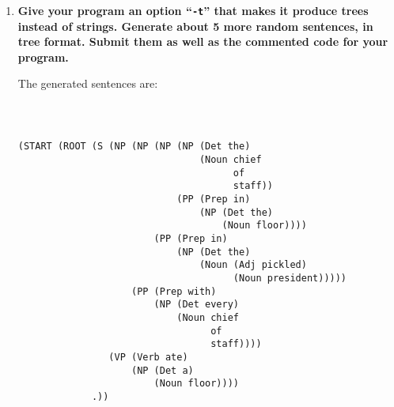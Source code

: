 \documentclass[10pt]{article}
\begin{document}
\begin{enumerate}
{\bf Sentence (d)}

I could not find the correct terminology for this type of verb, but I essentially added support for verbs that are followed by a ``that'' clause.

This also made me add the word ``that'' as a demonstrative adjective.

{\bf Sentence (e)}

To produce this sentence we need to support shifting the ordering of a sentence to allow ``that clauses'' to appear at the beginning. I believe this is an example of a deixis expression. Since it only happened in one place I did not try to abstract and generalize the rule.

{\bf Sentence (f)}

I added support for intensifiers that modify adjectives. There is now a recursive rule that allows you to tack on as many modifiers to an adjective as possible.

{\bf Sentence (g)}

I needed to add support phrasal verbs. Basically, verbs that are followed by a preposition that change the meaning. Note that this does not mean in general that any verb can be followed by a prepositional phrase.

{\bf Other}

I also added any missing words to the vocabulary as was necessary.


\item {\bf Give your program an option ``\verb|-t|'' that makes it produce
  trees instead of strings. Generate about 5 more random
sentences, in tree format. Submit them as well as the commented code
for your program.} 

The generated sentences are:

{\tt
\begin{verbatim}

(START (ROOT (S (NP (NP (NP (NP (Det the)
                                (Noun chief
                                      of
                                      staff))
                            (PP (Prep in)
                                (NP (Det the)
                                    (Noun floor))))
                        (PP (Prep in)
                            (NP (Det the)
                                (Noun (Adj pickled)
                                      (Noun president)))))
                    (PP (Prep with)
                        (NP (Det every)
                            (Noun chief
                                  of
                                  staff))))
                (VP (Verb ate)
                    (NP (Det a)
                        (Noun floor))))
             .))



\end{verbatim}}
\end{enumerate}
\end{document}

